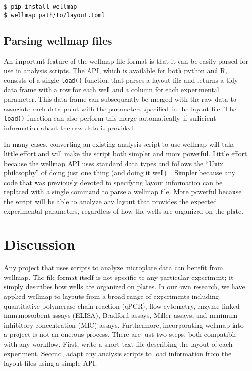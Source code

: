 \documentclass[twocolumn]{bmcart}
\begin{document}
\begin{lstlisting}
$ pip install wellmap
$ wellmap path/to/layout.toml
\end{lstlisting}


\subsection*{Parsing wellmap files}

An important feature of the wellmap file format is that it can be
easily parsed for use in analysis scripts. The API, which is available
for both python and R, consists of a single \texttt{load()} function
that parses a layout file and returns a tidy~\cite{wickham2014}
data frame with a row for each well and a column for each experimental
parameter. This data frame can subsequently be merged with the raw
data to associate each data point with the parameters specified in
the layout file. The \texttt{load()} function can also perform this
merge automatically, if sufficient information about the raw data
is provided.

In many cases, converting an existing analysis script to use wellmap
will take little effort and will make the script both simpler and
more powerful. Little effort because the wellmap API uses standard
data types and follows the ``Unix philosophy'' of doing just one
thing (and doing it well)~\cite{raymond2004}. Simpler because any
code that was previously devoted to specifying layout information
can be replaced with a single command to parse a wellmap file. More
powerful because the script will be able to analyze any layout that
provides the expected experimental parameters, regardless of how the
wells are organized on the plate.

\section*{Discussion}

Any project that uses scripts to analyze microplate data can benefit
from wellmap. The file format itself is not specific to any particular
experiment; it simply describes how wells are organized on plates.
In our own research, we have applied wellmap to layouts from a broad
range of experiments including quantitative polymerase chain reaction
(qPCR), flow cytometry, enzyme-linked immunosorbent assays (ELISA),
Bradford assays, Miller assays, and minimum inhibitory concentration
(MIC) assays. Furthermore, incorporating wellmap into a project is
not an onerous process. There are just two steps, both compatible
with any workflow. First, write a short text file describing the layout
of each experiment. Second, adapt any analysis scripts to load information
from the layout files using a simple API.
\end{document}
